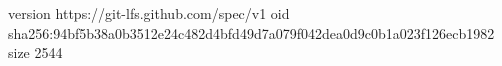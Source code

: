 version https://git-lfs.github.com/spec/v1
oid sha256:94bf5b38a0b3512e24c482d4bfd49d7a079f042dea0d9c0b1a023f126ecb1982
size 2544
